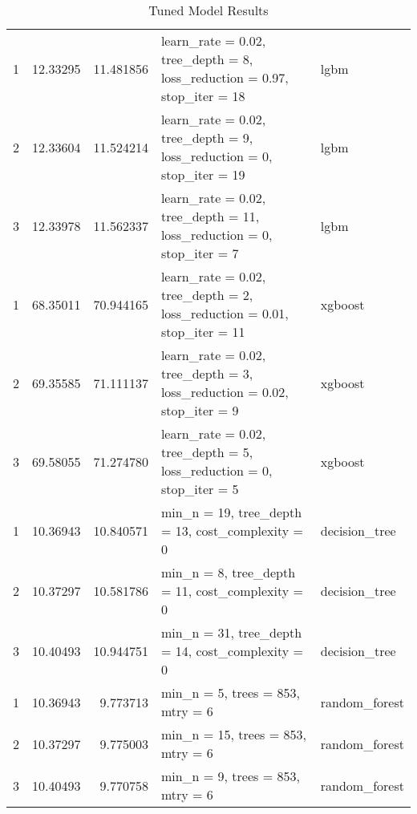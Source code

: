 \begin{table}[!h]

\caption{Tuned Model Results}
\centering
\fontsize{12}{14}\selectfont
\begin{tabular}[t]{r|r|r|l|l}
\hline
\cellcolor[HTML]{f2ebe6}{\textcolor{black}{\textbf{iteration}}} & \cellcolor[HTML]{f2ebe6}{\textcolor{black}{\textbf{mean}}} & \cellcolor[HTML]{f2ebe6}{\textcolor{black}{\textbf{Mape\_test}}} & \cellcolor[HTML]{f2ebe6}{\textcolor{black}{\textbf{models\_spec}}} & \cellcolor[HTML]{f2ebe6}{\textcolor{black}{\textbf{model\_name}}}\\
\hline
1 & 12.33295 & 11.481856 & learn\_rate = 0.02, tree\_depth = 8, loss\_reduction = 0.97, stop\_iter = 18 & lgbm\\
\hline
2 & 12.33604 & 11.524214 & learn\_rate = 0.02, tree\_depth = 9, loss\_reduction = 0, stop\_iter = 19 & lgbm\\
\hline
3 & 12.33978 & 11.562337 & learn\_rate = 0.02, tree\_depth = 11, loss\_reduction = 0, stop\_iter = 7 & lgbm\\
\hline
1 & 68.35011 & 70.944165 & learn\_rate = 0.02, tree\_depth = 2, loss\_reduction = 0.01, stop\_iter = 11 & xgboost\\
\hline
2 & 69.35585 & 71.111137 & learn\_rate = 0.02, tree\_depth = 3, loss\_reduction = 0.02, stop\_iter = 9 & xgboost\\
\hline
3 & 69.58055 & 71.274780 & learn\_rate = 0.02, tree\_depth = 5, loss\_reduction = 0, stop\_iter = 5 & xgboost\\
\hline
1 & 10.36943 & 10.840571 & min\_n = 19, tree\_depth = 13, cost\_complexity = 0 & decision\_tree\\
\hline
2 & 10.37297 & 10.581786 & min\_n = 8, tree\_depth = 11, cost\_complexity = 0 & decision\_tree\\
\hline
3 & 10.40493 & 10.944751 & min\_n = 31, tree\_depth = 14, cost\_complexity = 0 & decision\_tree\\
\hline
1 & 10.36943 & 9.773713 & min\_n = 5, trees = 853, mtry = 6 & random\_forest\\
\hline
2 & 10.37297 & 9.775003 & min\_n = 15, trees = 853, mtry = 6 & random\_forest\\
\hline
3 & 10.40493 & 9.770758 & min\_n = 9, trees = 853, mtry = 6 & random\_forest\\
\hline
\end{tabular}
\end{table}
